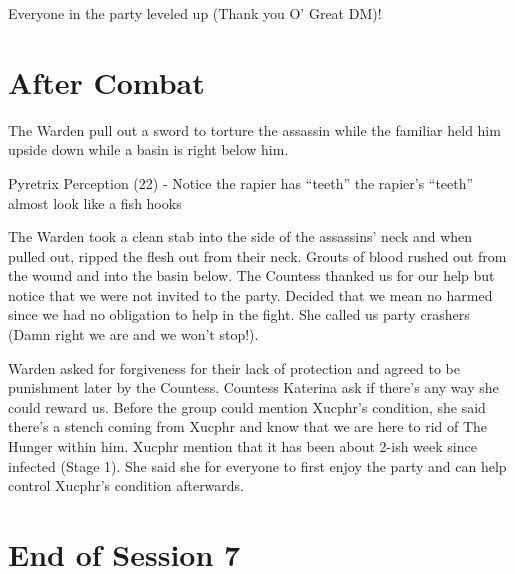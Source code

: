 Everyone in the party leveled up (Thank you O' Great DM)!

\section{After Combat}
	The Warden pull out a sword to torture the assassin while the familiar held him upside down while a basin is right below him. 

\begin{DndComment}{Pyretrix}
Perception (22) - Notice the rapier has “teeth” the rapier’s “teeth” almost look like a fish hooks
\end{DndComment}

The Warden took a clean stab into the side of the assassins' neck and when pulled out, ripped the flesh out from their neck. Grouts of blood rushed out from the wound and into the basin below. The Countess thanked us for our help but notice that we were not invited to the party. Decided that we mean no harmed since we had no obligation to help in the
fight. She called us party crashers (Damn right we are and we won't stop!). 

	Warden asked for forgiveness for their lack of protection and agreed to be punishment later by the Countess. Countess Katerina ask if there’s any way she could reward us. Before the group could mention Xucphr's condition, she said there's a stench coming from Xucphr and know that we are here to rid of The Hunger within him. Xucphr mention that it has been about 2-ish week since infected (Stage 1). She said she for everyone to first enjoy the party and can help control Xucphr's condition afterwards.
	
\section{End of Session 7}
